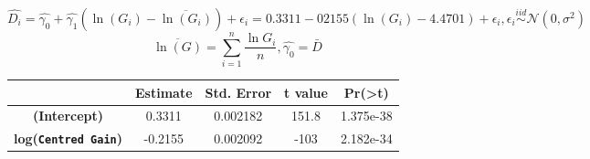 \documentclass[]{article}
\begin{document}
\[
  \hat{D_{i}} =
  \hat{\gamma_{0}} + \hat{\gamma_{1}}\left( \ln(G_{i}) - \overline{\ln(G_{i})} \right) + \epsilon_{i} =
  0.3311 - 02155\left( \ln(G_{i}) - 4.4701 \right) + \epsilon_{i},
  \epsilon_{i} \stackrel{iid}{\sim} \mathcal{N}(0,\sigma^{2})
\] \[
  \overline{\ln(G)} = \sum_{i=1}^{n}\frac{\ln{G_{i}}}{n},
  \hat{\gamma_{0}} = \bar{D}
\]

\begin{longtable}[]{@{}ccccc@{}}
\toprule
\begin{minipage}[b]{0.31\columnwidth}\centering\strut
~\strut
\end{minipage} & \begin{minipage}[b]{0.13\columnwidth}\centering\strut
Estimate\strut
\end{minipage} & \begin{minipage}[b]{0.16\columnwidth}\centering\strut
Std. Error\strut
\end{minipage} & \begin{minipage}[b]{0.12\columnwidth}\centering\strut
t value\strut
\end{minipage} & \begin{minipage}[b]{0.13\columnwidth}\centering\strut
Pr(\textgreater{}\textbar{}t\textbar{})\strut
\end{minipage}\tabularnewline
\midrule
\endhead
\begin{minipage}[t]{0.31\columnwidth}\centering\strut
\textbf{(Intercept)}\strut
\end{minipage} & \begin{minipage}[t]{0.13\columnwidth}\centering\strut
0.3311\strut
\end{minipage} & \begin{minipage}[t]{0.16\columnwidth}\centering\strut
0.002182\strut
\end{minipage} & \begin{minipage}[t]{0.12\columnwidth}\centering\strut
151.8\strut
\end{minipage} & \begin{minipage}[t]{0.13\columnwidth}\centering\strut
1.375e-38\strut
\end{minipage}\tabularnewline
\begin{minipage}[t]{0.31\columnwidth}\centering\strut
\textbf{log(\texttt{Centred\ Gain})}\strut
\end{minipage} & \begin{minipage}[t]{0.13\columnwidth}\centering\strut
-0.2155\strut
\end{minipage} & \begin{minipage}[t]{0.16\columnwidth}\centering\strut
0.002092\strut
\end{minipage} & \begin{minipage}[t]{0.12\columnwidth}\centering\strut
-103\strut
\end{minipage} & \begin{minipage}[t]{0.13\columnwidth}\centering\strut
2.182e-34\strut
\end{minipage}\tabularnewline
\bottomrule
\end{longtable}
\end{document}
